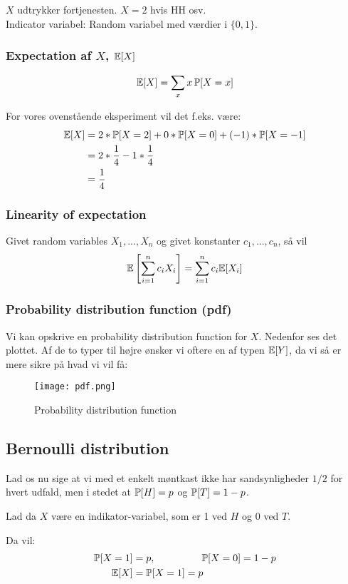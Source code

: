 $X$ udtrykker fortjenesten. $X = 2$ hvis HH osv.\\

Indicator variabel: Random variabel med værdier i $\{0, 1\}$.

\subsubsection{Expectation af $X$, $\e[X]$}
\begin{align} \label{eq:exp-random}
\e[X] = \sum_{x} x \, \P[X = x]
\end{align}

For vores ovenstående eksperiment vil det f.eks. være:
\begin{align*}
\e [X] &= 2 * \P[X = 2] + 0 * \P[X=0] + (-1) * \P[X = -1]\\
       &= 2 * \frac{1}{4} - 1 * \frac{1}{4}\\
       &= \frac{1}{4}
\end{align*}


\subsubsection{Linearity of expectation}
Givet random variables $X_1, ..., X_n$ og givet konstanter $c_1, ..., c_n$, så vil
\begin{align} \label{eq:linearity}
\e \square{\sum_{i=1}^{n} c_i X_i} = \sum_{i=1}^n c_i \e[X_i]
\end{align}


\subsubsection{Probability distribution function (pdf)}
Vi kan opskrive en probability distribution function for $X$. Nedenfor ses det plottet. Af de to typer til højre ønsker vi oftere en af typen $\e[Y]$, da vi så er mere sikre på hvad vi vil få:
\begin{figure}[H]
	\begin{center}
		\texttt{[image: pdf.png]}
	\end{center}
	\caption{Probability distribution function}
	\label{fig:pdf}
\end{figure}

\subsection{Bernoulli distribution}
Lad os nu sige at vi med et enkelt møntkast ikke har sandsynligheder $1/2$ for hvert udfald, men i stedet at $\P[H] = p$ og $\P[T] = 1-p$.

Lad da $X$ være en indikator-variabel, som er 1 ved $H$ og 0 ved $T$.

Da vil:
\begin{align*}
\P[X = 1] &= p, \longspace \P[X = 0] = 1 - p\\
    \e[X] &= \P[X = 1] = p
\end{align*}
